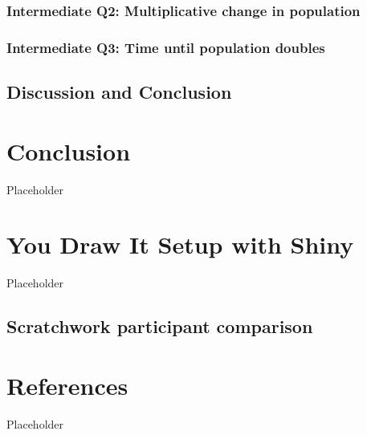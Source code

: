 \documentclass[print]{nuthesis}
\begin{document}
\hypertarget{intermediate-q2-multiplicative-change-in-population}{%
\subsection{Intermediate Q2: Multiplicative change in population}\label{intermediate-q2-multiplicative-change-in-population}}

\hypertarget{intermediate-q3-time-until-population-doubles}{%
\subsection{Intermediate Q3: Time until population doubles}\label{intermediate-q3-time-until-population-doubles}}

\hypertarget{discussion-and-conclusion-2}{%
\section{Discussion and Conclusion}\label{discussion-and-conclusion-2}}

\hypertarget{conclusion}{%
\chapter{Conclusion}\label{conclusion}}

Placeholder

\hypertarget{youdrawit-with-shiny}{%
\chapter{You Draw It Setup with Shiny}\label{youdrawit-with-shiny}}

Placeholder

\hypertarget{estimation-comparison}{%
\section{Scratchwork participant comparison}\label{estimation-comparison}}

\hypertarget{references}{%
\chapter*{References}\label{references}}

Placeholder
\end{document}
